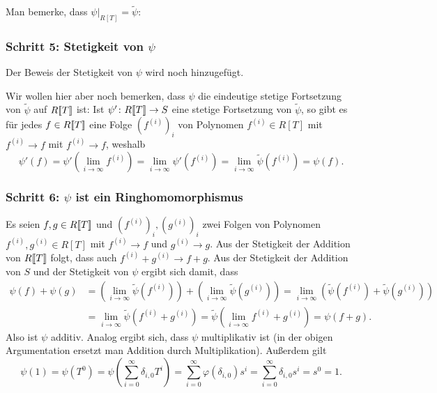 \documentclass[a4paper, 10pt, numbers=noenddot]{scrartcl}
\begin{document}
Man bemerke, dass $\psi|_{R[T]} = \tilde{\psi}$:


\subsubsection*{Schritt 5: Stetigkeit von $\psi$}
Der Beweis der Stetigkeit von $\psi$ wird noch hinzugefügt.

Wir wollen hier aber noch bemerken, dass $\psi$ die eindeutige stetige Fortsetzung von $\tilde{\psi}$ auf $R[\![T]\!]$ ist:
Ist $\psi' \colon R[\![T]\!] \to S$ eine stetige Fortsetzung von $\tilde{\psi}$, so gibt es für jedes $f \in R[\![T]\!]$ eine Folge $(f^{(i)})_i$ von Polynomen $f^{(i)} \in R[T]$ mit $f^{(i)} \to f$ mit $f^{(i)} \to f$, weshalb
\[
    \psi'(f)
  = \psi'\left( \lim_{i \to \infty} f^{(i)} \right)
  = \lim_{i \to \infty} \psi'( f^{(i)} )
  = \lim_{i \to \infty} \tilde{\psi}( f^{(i)} )
  = \psi(f).
\]


\subsubsection*{Schritt 6: $\psi$ ist ein Ringhomomorphismus}
Es seien $f, g \in R[\![T]\!]$ und $(f^{(i)})_i, (g^{(i)})_i$ zwei Folgen von Polynomen $f^{(i)}, g^{(i)} \in R[T]$ mit $f^{(i)} \to f$ und $g^{(i)} \to g$.
Aus der Stetigkeit der Addition von $R[\![T]\!]$ folgt, dass auch $f^{(i)} + g^{(i)} \to f + g$.
Aus der Stetigkeit der Addition von $S$ und der Stetigkeit von $\psi$ ergibt sich damit, dass
\begin{align*}
        \psi(f) + \psi(g)
  &=    \left( \lim_{i \to \infty} \tilde{\psi}(f^{(i)}) \right)
      + \left( \lim_{i \to \infty} \tilde{\psi}(g^{(i)}) \right)
   =  \lim_{i \to \infty} ( \tilde{\psi}(f^{(i)}) + \tilde{\psi}(g^{(i)} ) )
  \\
  &=  \lim_{i \to \infty} \tilde{\psi}( f^{(i)} + g^{(i)} )
   =  \tilde{\psi}\left( \lim_{i \to \infty} f^{(i)} + g^{(i)} \right)
   =  \psi(f + g).
\end{align*}
Also ist $\psi$ additiv.
Analog ergibt sich, dass $\psi$ multiplikativ ist (in der obigen Argumentation ersetzt man Addition durch Multiplikation).
Außerdem gilt
\[
    \psi(1)
  = \psi(T^0)
  = \psi\left( \sum_{i=0}^\infty \delta_{i,0} T^i \right)
  = \sum_{i=0}^\infty \varphi(\delta_{i,0}) s^i
  = \sum_{i=0}^\infty \delta_{i,0} s^i
  = s^0
  = 1.
\]
\end{document}
